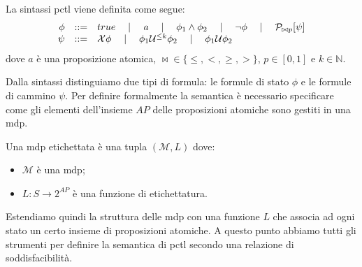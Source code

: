 \begin{mtdef}
	La sintassi \ac{pctl} viene definita come segue:
$$
\begin{array}{rcl}
	\phi &::=& true \quad\mid\quad \mathit{a} \quad\mid\quad \phi_1 \wedge \phi_2 \quad\mid\quad \neg\phi \quad\mid\quad \mathcal{P}_{\bowtie p}[\psi] \\
	\psi &::=& \mathcal{X}\phi \quad\mid\quad \phi_1 \mathcal{U}^{\leq k} \phi_2 \quad\mid\quad \phi_1 \mathcal{U} \phi_2 \\
\end{array}
$$
dove $\mathit{a}$ è una proposizione atomica, $\bowtie \in \{\leq,<,\geq,>\}$, $p \in[0,1]$ e $k \in \mathbb{N}$.
\end{mtdef}
Dalla sintassi distinguiamo due tipi di formula: le formule di stato $\phi$ e le formule di cammino $\psi$. Per definire formalmente la semantica è necessario specificare come gli elementi dell'insieme $AP$ delle proposizioni atomiche sono gestiti in una \ac{mdp}.
\begin{mtdef}
	Una \ac{mdp} etichettata è una tupla $(\mathcal{M},L)$ dove:
	\begin{itemize}
		\item $\mathcal{M}$ è una \ac{mdp};
		\item $L:S\rightarrow 2^{AP}$ è una funzione di etichettatura.
	\end{itemize}
\end{mtdef}
Estendiamo quindi la struttura delle \ac{mdp} con una funzione $L$ che associa ad ogni stato un certo insieme di proposizioni atomiche. A questo punto abbiamo tutti gli strumenti per definire la semantica di \ac{pctl} secondo una relazione di soddisfacibilità.
